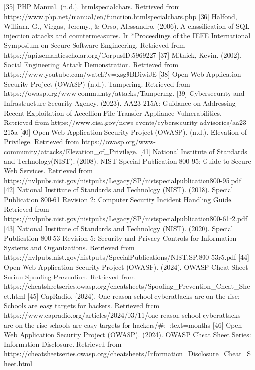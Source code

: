 \documentclass[letterpaper,twocolumn]{article}
\begin{document}
[35] PHP Manual. (n.d.). htmlspecialchars. Retrieved from https://www.php.net/manual/en/function.htmlspecialchars.php
[36] Halfond, William. G., Viegas, Jeremy., & Orso, Alessandro. (2006). A classification of SQL injection attacks and countermeasures. In *Proceedings of the IEEE International Symposium on Secure Software Engineering. Retrieved from https://api.semanticscholar.org/CorpusID:5969227
[37] Mitnick, Kevin. (2002). Social Engineering Attack Demonstration. Retrieved from https://www.youtube.com/watch?v=xsg9BDiwiJE
[38] Open Web Application Security Project (OWASP) (n.d.). Tampering. Retrieved from https://owasp.org/www-community/attacks/Tampering.
[39] Cybersecurity and Infrastructure Security Agency. (2023). AA23-215A: Guidance on Addressing Recent Exploitation of Accellion File Transfer Appliance Vulnerabilities. Retrieved from https://www.cisa.gov/news-events/cybersecurity-advisories/aa23-215a
[40] Open Web Application Security Project (OWASP). (n.d.). Elevation of Privilege. Retrieved from https://owasp.org/www-community/attacks/Elevation_of_Privilege.
[41] National Institute of Standards and Technology(NIST). (2008). NIST Special Publication 800-95: Guide to Secure Web Services. Retrieved from https://nvlpubs.nist.gov/nistpubs/Legacy/SP/nistspecialpublication800-95.pdf
[42] National Institute of Standards and Technology (NIST). (2018). Special Publication 800-61 Revision 2: Computer Security Incident Handling Guide. Retrieved from https://nvlpubs.nist.gov/nistpubs/Legacy/SP/nistspecialpublication800-61r2.pdf
[43] National Institute of Standards and Technology (NIST). (2020). Special Publication 800-53 Revision 5: Security and Privacy Controls for Information Systems and Organizations. Retrieved from https://nvlpubs.nist.gov/nistpubs/SpecialPublications/NIST.SP.800-53r5.pdf
[44] Open Web Application Security Project (OWASP). (2024). OWASP Cheat Sheet Series: Spoofing Prevention. Retrieved from https://cheatsheetseries.owasp.org/cheatsheets/Spoofing_Prevention_Cheat_Sheet.html
[45] CapRadio. (2024). One reason school cyberattacks are on the rise: Schools are easy targets for hackers. Retrieved from https://www.capradio.org/articles/2024/03/11/one-reason-school-cyberattacks-are-on-the-rise-schools-are-easy-targets-for-hackers/#:~:text=months%
[46] Open Web Application Security Project (OWASP). (2024). OWASP Cheat Sheet Series: Information Disclosure. Retrieved from https://cheatsheetseries.owasp.org/cheatsheets/Information_Disclosure_Cheat_Sheet.html
\end{document}
